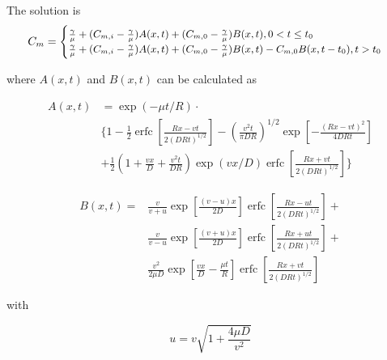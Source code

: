 \documentclass{report}
\newcommand{\erfc}{\operatorname{erfc}}                 %
\begin{document}


The solution is
%
\begin{equation}
\begin{small}
C_m=\begin{cases}\frac{\gamma}{\mu}+ (C_{m,i}-\frac{\gamma}{\mu})A(x,t)+(C_{m,0}-\frac{\gamma}{\mu})B(x,t), 0<t\leq t_0 \\
\frac{\gamma}{\mu} +
(C_{m,i}-\frac{\gamma}{\mu})A(x,t)+(C_{m,0}-\frac{\gamma}{\mu})B(x,t)-C_{m,0}B(x,t-t_0),
t>t_0
\end{cases}
\end{small}
\end{equation}


where $A(x,t)$ and $B(x,t)$ can be calculated as

\begin{equation}
\begin{split}
A(x,t) & =\exp(-\mu t/R)\cdot \\
& \bigg\{ 1-\frac{1}{2}\erfc\left[\frac{Rx-vt}{2(DRt)^{1/2}}\right]
-\left(\frac{v^2t}{\pi
    DR}\right)^{1/2}\exp\left[-\frac{(Rx-vt)^2}{4DRt}\right] \\ &
+\frac{1}{2}\left(1+\frac{vx}{D}+\frac{v^2t}{DR}\right)\exp(vx/D)\erfc\left[\frac{Rx+vt}{2(DRt)^{1/2}}\right]
\bigg\}
\end{split}
\end{equation}

\begin{equation}
\begin{split}
B(x,t)=&\frac{v}{v+u}\exp\left[\frac{(v-u)x}{2D}\right]\erfc\left[\frac{Rx-ut}{2(DRt)^{1/2}}\right]
+\\
&
\frac{v}{v-u}\exp\left[\frac{(v+u)x}{2D}\right]\erfc\left[\frac{Rx+ut}{2(DRt)^{1/2}}\right]
+\\ &
 \frac{v^2}{2\mu D}\exp\left[\frac{vx}{D}-\frac{\mu
     t}{R}\right]\erfc\left[\frac{Rx+vt}{2(DRt)^{1/2}}\right]
\end{split}
\end{equation}

with

\begin{equation}
u=v \sqrt{1+\frac{4\mu D}{v^2}}
\end{equation}
\end{document}
